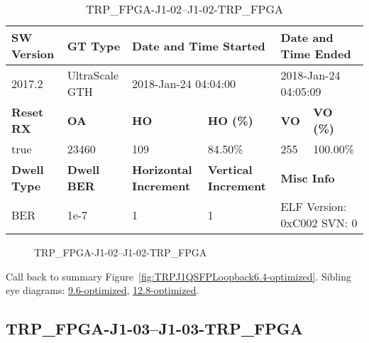 \begin{table}[h]
\centering
\caption{TRP\_FPGA-J1-02--J1-02-TRP\_FPGA}
\label{tab:TRPFPGAJ102J102TRPFPGA6.4-optimized}
\begin{tabular}{@{}|l|l|l|l|l|l|@{}}
\toprule
\textbf{SW Version}                & \textbf{GT Type}   & \multicolumn{2}{l|}{\textbf{Date and Time Started}}            & \multicolumn{2}{l|}{\textbf{Date and Time Ended}}        \\ \midrule
2017.2                       & UltraScale GTH          & \multicolumn{2}{l|}{2018-Jan-24 04:04:00}                   & \multicolumn{2}{l|}{2018-Jan-24 04:05:09}               \\ \midrule
\textbf{Reset RX}                  & \textbf{OA} & \textbf{HO}   & \textbf{HO (\%)} & \textbf{VO} & \textbf{VO (\%)} \\ \midrule
true & 23460        & 109          & 84.50\%        & 255        & 100.00\%       \\ \midrule
\textbf{Dwell Type}                & \textbf{Dwell BER} & \textbf{Horizontal Increment} & \textbf{Vertical Increment}    & \multicolumn{2}{l|}{\textbf{Misc Info}}                  \\ \midrule
BER                            & 1e-7        & 1        & 1           & \multicolumn{2}{l|}{ELF Version: 0xC002 SVN: 0}                         \\ \bottomrule
\end{tabular}
\end{table}

\begin{figure}[h]
\caption{TRP\_FPGA-J1-02--J1-02-TRP\_FPGA} \label{fig:TRPFPGAJ102J102TRPFPGA6.4-optimized}
\end{figure}

Call back to summary Figure~\ref{fig:TRPJ1QSFPLoopback6.4-optimized}.
Sibling eye diagrams: \hyperref[sec:TRPFPGAJ102J102TRPFPGA9.6-optimized]{9.6-optimized}, \hyperref[sec:TRPFPGAJ102J102TRPFPGA12.8-optimized]{12.8-optimized}.

\clearpage
\newpage


\subsection{TRP\_FPGA-J1-03--J1-03-TRP\_FPGA}\label{sec:TRPFPGAJ103J103TRPFPGA6.4-optimized}


